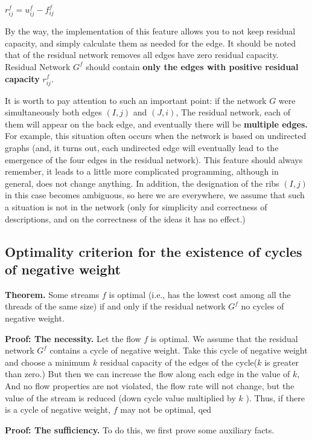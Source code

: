 $r_ {ij} ^ f = u_ {ij} ^ f - f_ {ij} ^ f$

By the way, the implementation of this feature allows you to not keep residual capacity, and simply calculate them as needed for the edge.
It should be noted that of the residual network removes all edges have zero residual capacity. Residual Network $G ^ f$ should contain \textbf{only the edges with positive residual capacity} \textbf{$r_ {ij} ^ f$}.

It is worth to pay attention to such an important point: if the network $G$ were simultaneously both edges $(I, j)$ and $(J, i)$, The residual network, each of them will appear on the back edge, and eventually there will be \textbf{multiple edges.} For example, this situation often occurs when the network is based on undirected graphs (and, it turns out, each undirected edge will eventually lead to the emergence of the four edges in the residual network). This feature should always remember, it leads to a little more complicated programming, although in general, does not change anything. In addition, the designation of the ribs $(I, j)$ in this case becomes ambiguous, so here we are everywhere, we assume that such a situation is not in the network (only for simplicity and correctness of descriptions, and on the correctness of the ideas it has no effect.)

\subsection{ Optimality criterion for the existence of cycles of negative weight }

\textbf{Theorem.} Some streams $f$ is optimal (i.e., has the lowest cost among all the threads of the same size) if and only if the residual network $G ^ f$ no cycles of negative weight.

\textbf{Proof: The necessity.} Let the flow $f$ is optimal. We assume that the residual network $G ^ f$ contains a cycle of negative weight. Take this cycle of negative weight and choose a minimum $k$ residual capacity of the edges of the cycle($k$ is greater than zero.) But then we can increase the flow along each edge in the value of $k$, And no flow properties are not violated, the flow rate will not change, but the value of the stream is reduced (down cycle value multiplied by $k$ ). Thus, if there is a cycle of negative weight, $f$ may not be optimal, qed

\textbf{Proof: The sufficiency.} To do this, we first prove some auxiliary facts.

